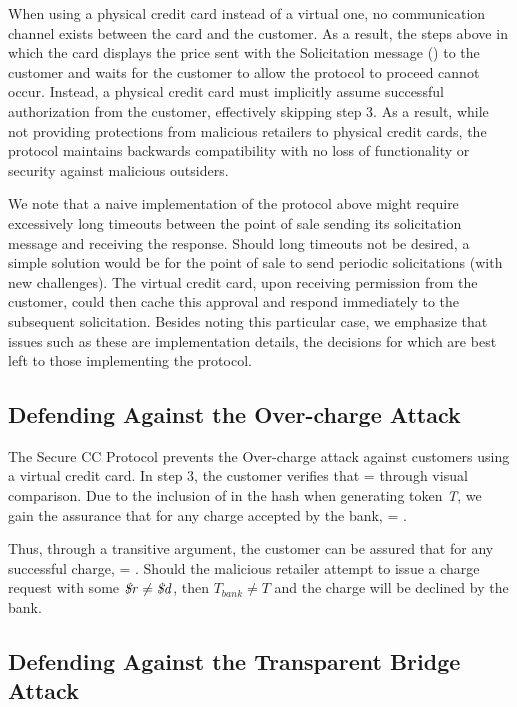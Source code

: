 When using a physical credit card instead of a virtual one, no communication channel exists between the card and the customer.
As a result, the steps above in which the card displays the price sent with the Solicitation message () to the customer and waits for the customer to allow the protocol to proceed cannot occur.
Instead, a physical credit card must implicitly assume successful authorization from the customer, effectively skipping step 3.
As a result, while not providing protections from malicious retailers to physical credit cards, the protocol maintains backwards compatibility with no loss of functionality or security against malicious outsiders.

We note that a naive implementation of the protocol above might require excessively long timeouts between the point of sale sending its solicitation message and receiving the response.
Should long timeouts not be desired, a simple solution would be for the point of sale to send periodic solicitations (with new challenges).
The virtual credit card, upon receiving permission from the customer, could then cache this approval and respond immediately to the subsequent solicitation.
Besides noting this particular case, we emphasize that issues such as these are implementation details, the decisions for which are best left to those implementing the protocol.

\subsection{Defending Against the Over-charge Attack}

The Secure CC Protocol prevents the Over-charge attack against customers using a virtual credit card.
In step 3, the customer verifies that \linebreak {} =  through visual comparison.
Due to the inclusion of  in the hash when generating token \emph{T}, we gain the assurance that for any charge accepted by the bank,  = .

Thus, through a transitive argument, the customer can be assured that for any successful charge,  = .
Should the malicious retailer attempt to issue a charge request with some $\textrm{\emph{\$r}} \neq \textrm{\emph{\$d}}$, then $T_{bank} \neq T$ and the charge will be declined by the bank.

\subsection{Defending Against the Transparent Bridge Attack}

